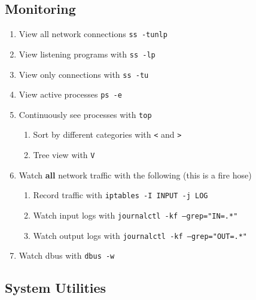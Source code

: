 \documentclass[12pt,letterpaper]{article}
\def\code#1{\textcolor{iris}{\texttt{#1}}}
\def\bf#1{\textbf{#1}}
\begin{document}
\subsection{Monitoring}

\begin{enumerate}
	\item View all network connections \code{ss -tunlp}
	\item View listening programs with \code{ss -lp}
	\item View only connections with \code{ss -tu}
	\item View active processes \code{ps -e}
	\item Continuously see processes with \code{top}
		\begin{enumerate}
			\item Sort by different categories with \code{<} and \code{>}
			\item Tree view with \code{V}
		\end{enumerate}
	\item Watch \bf{all} network traffic with the following (this is a fire hose)
		\begin{enumerate}
			\item Record traffic with \code{iptables -I INPUT -j LOG}
			\item Watch input logs with \code{journalctl -kf --grep="IN=.*"}
			\item Watch output logs with \code{journalctl -kf --grep="OUT=.*"}
		\end{enumerate}
	\item Watch dbus with \code{dbus -w}
\end{enumerate}

\subsection{System Utilities}
\end{document}
